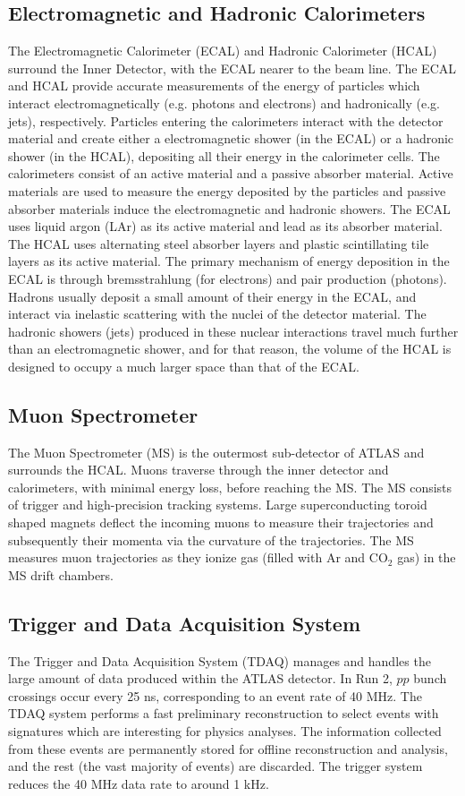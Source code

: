 \subsection{Electromagnetic and Hadronic Calorimeters}
The Electromagnetic Calorimeter (ECAL) and Hadronic Calorimeter (HCAL) surround the Inner Detector, with the ECAL nearer to the beam line. The ECAL and HCAL provide accurate measurements of the energy of particles which interact electromagnetically (e.g. photons and electrons) and hadronically (e.g. jets), respectively. Particles entering the calorimeters interact with the detector material and create either a electromagnetic shower (in the ECAL) or a hadronic shower (in the HCAL), depositing all their energy in the calorimeter cells. The calorimeters consist of an active material and a passive absorber material. Active materials are used to measure the energy deposited by the particles and passive absorber materials induce the electromagnetic and hadronic showers. The ECAL uses liquid argon (LAr) as its active material and lead as its absorber material. The HCAL uses alternating steel absorber layers and plastic scintillating tile layers as its active material. The primary mechanism of energy deposition in the ECAL is through bremsstrahlung (for electrons) and pair production (photons). Hadrons usually deposit a small amount of their energy in the ECAL, and interact via inelastic scattering with the nuclei of the detector material. The hadronic showers (jets) produced in these nuclear interactions travel much further than an electromagnetic shower, and for that reason, the volume of the HCAL is designed to occupy a much larger space than that of the ECAL.

\subsection{Muon Spectrometer}
The Muon Spectrometer (MS) is the outermost sub-detector of ATLAS and surrounds the HCAL. Muons traverse through the inner detector and calorimeters, with minimal energy loss, before reaching the MS. The MS consists of trigger and high-precision tracking systems. Large superconducting toroid shaped magnets deflect the incoming muons to measure their trajectories and subsequently their momenta via the curvature of the trajectories. The MS measures muon trajectories as they ionize gas (filled with Ar and CO$_{2}$ gas) in the MS drift chambers.

\subsection{Trigger and Data Acquisition System}
The Trigger and Data Acquisition System (TDAQ) manages and handles the large amount of data produced within the ATLAS detector. In Run 2, $pp$ bunch crossings occur every 25 ns, corresponding to an event rate of 40 MHz. The TDAQ system performs a fast preliminary reconstruction to select events with signatures which are interesting for physics analyses. The information collected from these events are permanently stored for offline reconstruction and analysis, and the rest (the vast majority of events) are discarded. The trigger system reduces the 40 MHz data rate to around 1 kHz.



